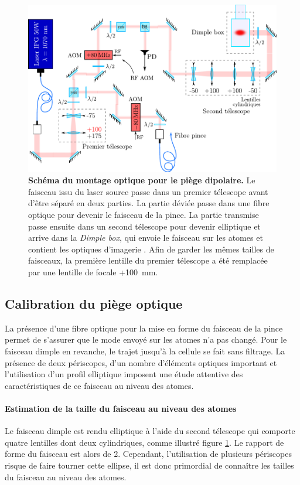 \begin{figure}
\centering
\includegraphics[width=\textwidth]{../Fig/Modif_exp/optique_1070_new_style.pdf}
\caption{\textbf{Schéma du montage optique pour le piège dipolaire.} Le faisceau issu du laser source passe dans un premier télescope avant d'être séparé en deux parties. La partie déviée passe dans une fibre optique pour devenir le faisceau de la pince. La partie transmise passe ensuite dans un second télescope pour devenir elliptique et arrive dans la \emph{Dimple box}, qui envoie le faisceau sur les atomes et contient les optiques d'imagerie \citep{muller2015coherent}. Afin de garder les mêmes tailles de faisceaux, la première lentille du premier télescope a été remplacée par une lentille de focale +\SI{100}{\milli\metre}.}
\label{fig:optique_1070}
\end{figure}


\subsection{Calibration du piège optique}
La présence d'une fibre optique pour la mise en forme du faisceau de la pince permet de s'assurer que le mode envoyé sur les atomes n'a pas changé. Pour le faisceau dimple en revanche, le trajet jusqu'à la cellule se fait sans filtrage. La présence de deux périscopes, d'un nombre d'éléments optiques important et l'utilisation d'un profil elliptique imposent une étude attentive des caractéristiques de ce faisceau au niveau des atomes.



\paragraph*{Estimation de la taille du faisceau au niveau des atomes}
Le faisceau dimple est rendu elliptique à l'aide du second télescope qui comporte quatre lentilles dont deux cylindriques, comme illustré figure \ref{fig:optique_1070}. Le rapport de forme du faisceau est alors de 2. Cependant, l'utilisation de plusieurs périscopes risque de faire tourner cette ellipse, il est donc primordial de connaître les tailles du faisceau au niveau des atomes.

